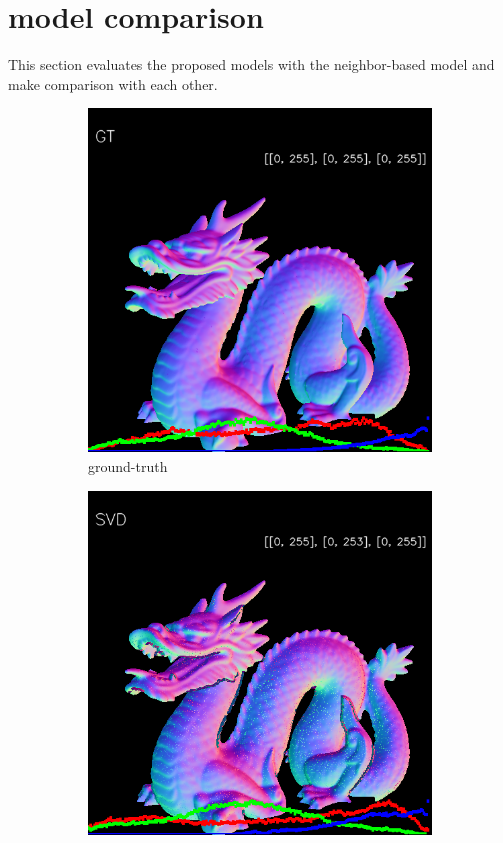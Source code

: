 \newpage 
\section{model comparison}
This section evaluates the proposed models with the neighbor-based model and make comparison with each other.

\begin{figure}[h!]
	\centering
	\begin{subfigure}[b]{0.24\linewidth}
		\includegraphics[width=\linewidth]{./Figures/comparison/fancy_eval_3_groundtruth.png}
		\caption{ground-truth}
	\end{subfigure}
	\begin{subfigure}[b]{0.24\linewidth}
		\includegraphics[width=\linewidth]{./Figures/comparison/fancy_eval_3_normal_svd.png}

\end{subfigure}
\end{figure}
